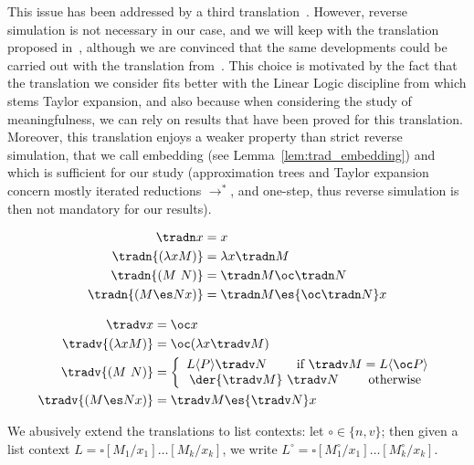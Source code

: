 This issue has been addressed by a third translation~\cite{agk24d}.
However, reverse simulation is not necessary in our case, and we will
keep with the translation proposed in~\cite{bucciarelli2023bang},
although we are convinced that the same developments could be carried
out with the translation from~\cite{agk24d}. This choice is motivated
by the fact that the translation we consider fits better with the
Linear Logic discipline from which stems Taylor expansion, and also
because when considering the study of meaningfulness, we can rely on
results that have been proved for this translation. Moreover, this
translation enjoys a weaker property than strict reverse simulation,
that we call embedding (see Lemma~\ref{lem:trad_embedding}) and which
is sufficient for our study (approximation trees and Taylor expansion concern
mostly iterated reductions $\to^*$, and one-step, thus reverse
simulation is then not mandatory for our results).
\begin{center}
\begin{minipage}{0.30\textwidth}
\begin{align*}
	\tradn x &=  x \\
	\tradn{(\lambda x M)} &= \lambda x \tradn M \\
	\tradn{(M~N)} &= \tradn M \oc \tradn N \\
	\tradn{(M\es Nx)} &= \tradn M\es{\oc \tradn N}x
\end{align*}
\end{minipage}
\hfill
\begin{minipage}{0.30\textwidth}
\begin{align*}
	\tradv x &= \oc x \\
	\tradv{(\lambda x M)} &= \oc (\lambda x \tradv M) \\
	\tradv{(M~N)} &= \left\{
		\begin{array}{c}
		L\langle P \rangle \tradv N \qquad \text{ if } \tradv M = L \langle \oc P \rangle \\
		\der{\tradv M}~\tradv N \qquad \text{ otherwise }
		\end{array}
	\right. \\
	\tradv{(M\es Nx)} &= \tradv M\es{\tradv N}x
\end{align*}
\end{minipage}
\end{center}

We abusively extend the translations to list contexts: let
$\circ\in\{n,v\}$; then given a list context
$L=\square[M_1/x_1]\dots [M_k/x_k]$, we write
$L^\circ=\square[M_1^\circ/x_1]\dots [M_k^\circ/x_k]$.

